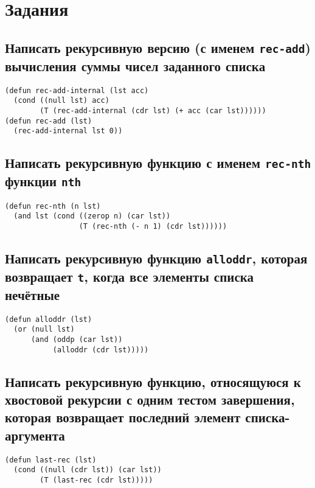 \chapter{Задания}

\section{Написать рекурсивную версию (с именем \texttt{rec-add}) вычисления суммы чисел заданного списка}

\begin{lstlisting}
(defun rec-add-internal (lst acc)
  (cond ((null lst) acc)
        (T (rec-add-internal (cdr lst) (+ acc (car lst))))))
(defun rec-add (lst)
  (rec-add-internal lst 0))
\end{lstlisting}

\section{Написать рекурсивную функцию с именем \texttt{rec-nth} функции \texttt{nth}}

\begin{lstlisting}
(defun rec-nth (n lst)
  (and lst (cond ((zerop n) (car lst))
                 (T (rec-nth (- n 1) (cdr lst))))))
\end{lstlisting}

\section{Написать рекурсивную функцию \texttt{alloddr}, которая возвращает \texttt{t}, когда все элементы списка нечётные}

\begin{lstlisting}
(defun alloddr (lst)
  (or (null lst) 
      (and (oddp (car lst))
           (alloddr (cdr lst)))))
\end{lstlisting}

\section{Написать рекурсивную функцию, относящуюся к хвостовой рекурсии с одним тестом завершения, которая возвращает последний элемент списка-аргумента}


\begin{lstlisting}
(defun last-rec (lst)
  (cond ((null (cdr lst)) (car lst))
        (T (last-rec (cdr lst)))))
\end{lstlisting}

